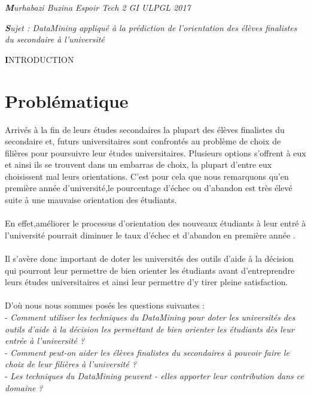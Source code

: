 \begin{center}
	\textit{ \textbf Murhabazi Buzina Espoir Tech 2 GI ULPGL 2017}
\end{center}
\begin{center}
	 \textit{ \textbf Sujet : DataMining appliqué à la prédiction de l'\textbf{}orientation des élèves finalistes du secondaire à l'université }
\end{center}
\begin{center}
	 {\LARGE  \textbf INTRODUCTION}	
	\end{center}
\section{Problématique}
Arrivés à la fin de leurs études secondaires la plupart des élèves finalistes du secondaire et, futurs universitaires sont confrontés au problème de choix de filières pour poursuivre leur études universitaires.
Plusieurs options s'offrent à eux et ainsi ils se trouvent dans un embarras de choix, la plupart d'entre eux choisissent mal leurs orientations.
C'est pour cela que nous remarquons qu'en première année d'université,le pourcentage d'échec ou d'abandon est très élevé suite à une mauvaise orientation des étudiants.\cite{Articl1Mr} 
\paragraph{}
En effet,améliorer le processus d'orientation des nouveaux étudiants à leur entré à l'université pourrait diminuer le taux d'échec et d'abandon en première année .
\paragraph{}
Il s'avère donc important de doter les universités des outils d'aide à la décision qui pourront leur permettre de bien orienter les étudiants avant d'entreprendre leurs études universitaires et ainsi leur permettre d'y tirer pleine satisfaction.  
\paragraph{}
D'où nous nous sommes posés les questions suivantes : \\
- \emph{Comment utiliser les techniques  du DataMining pour doter les universités des outils d'aide à la décision les permettant de bien orienter les étudiants dès leur entrée à l'université ?  }\\
- \emph{Comment peut-on aider les élèves finalistes du secondaires  à pouvoir faire le choix de leur filières à l'université ? }\\
- \emph{Les techniques du DataMining peuvent - elles apporter leur contribution dans ce domaine ? }
